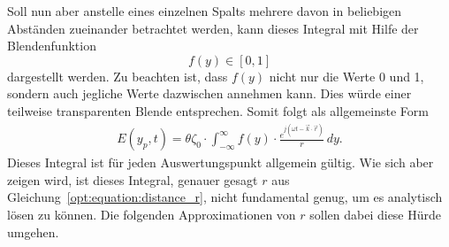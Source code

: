 Soll nun aber anstelle eines einzelnen Spalts mehrere davon in beliebigen Abständen zueinander betrachtet werden, kann dieses Integral mit Hilfe der Blendenfunktion
\begin{equation}
f(y)
\in
[0, 1]
\end{equation}
dargestellt werden.
Zu beachten ist, dass $f(y)$ nicht nur die Werte 0 und 1, sondern auch jegliche Werte dazwischen annehmen kann.
Dies würde einer teilweise transparenten Blende entsprechen.
Somit folgt als allgemeinste Form
\begin{align}
E(y_p, t)
=
\theta\zeta_0 \cdot \int_{-\infty}^{\infty}f(y)\cdot\frac{e^{j(\omega t - \vec{k}\cdot\vec{r})}}{r} \,dy
.
\label{opt:equation:integral_general}
\end{align}
Dieses Integral ist für jeden Auswertungspunkt allgemein gültig.
Wie sich aber zeigen wird, ist dieses Integral, genauer gesagt $r$ aus Gleichung~\ref{opt:equation:distance_r}, nicht fundamental genug, um es analytisch lösen zu können.
Die folgenden Approximationen von $r$ sollen dabei diese Hürde umgehen.

